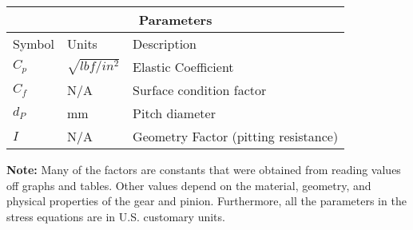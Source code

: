 \documentclass[letterpaper,12pt]{article}
\begin{document}
\begin{center}
	\begin{tabular}{ |p{2cm}||p{2cm}|p{7cm}|  }
		\hline
		\multicolumn{3}{|c|}{Parameters} \\
		\hline
		Symbol & Units & Description\\
		\hline
		$C_p$ & $\sqrt{lbf/in^2}$ & Elastic Coefficient\\
		$C_f$ & N/A & Surface condition factor\\
		$d_P$ & mm & Pitch diameter\\
		$I$ & N/A & Geometry Factor (pitting resistance)\\
		\hline
	\end{tabular}
\end{center}

\noindent\textbf{Note:} Many of the factors are constants that were obtained from reading values off graphs and tables. Other values depend on the material, geometry, and physical properties of the gear and pinion. Furthermore, all the parameters in the stress equations are in U.S. customary units. \\
\end{document}
